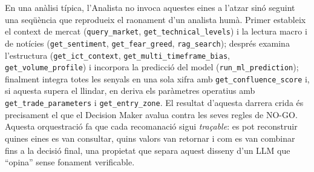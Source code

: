 \documentclass[10pt,twocolumn,a4paper]{article}
\begin{document}
En una anàlisi típica, l'Analista no invoca aquestes eines a l'atzar sinó seguint
una seqüència que reprodueix el raonament d'un analista humà. Primer estableix el
context de mercat (\texttt{query\_market}, \texttt{get\_technical\_levels}) i la
lectura macro i de notícies (\texttt{get\_sentiment}, \texttt{get\_fear\_greed},
\texttt{rag\_search}); després examina l'estructura (\texttt{get\_ict\_context},
\texttt{get\_multi\_timeframe\_bias}, \texttt{get\_volume\_profile}) i incorpora la
predicció del model (\texttt{run\_ml\_prediction}); finalment integra totes les
senyals en una sola xifra amb \texttt{get\_confluence\_score} i, si aquesta supera
el llindar, en deriva els paràmetres operatius amb \texttt{get\_trade\_parameters} i
\texttt{get\_entry\_zone}. El resultat d'aquesta darrera crida és precisament el que
el Decision Maker avalua contra les seves regles de NO-GO. Aquesta orquestració fa
que cada recomanació sigui \emph{traçable}: es pot reconstruir quines eines es van
consultar, quins valors van retornar i com es van combinar fins a la decisió final,
una propietat que separa aquest disseny d'un LLM que ``opina'' sense fonament
verificable.
\end{document}

